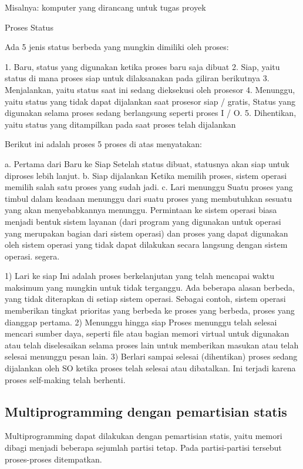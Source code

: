 Misalnya: komputer yang dirancang untuk tugas proyek

Proses Status

Ada 5 jenis status berbeda yang mungkin dimiliki oleh proses:

1. Baru, status yang digunakan ketika proses baru saja dibuat
2. Siap, yaitu status di mana proses siap untuk dilaksanakan pada giliran berikutnya
3. Menjalankan, yaitu status saat ini sedang dieksekusi oleh prosesor
4. Menunggu, yaitu status yang tidak dapat dijalankan saat prosesor siap / gratis, Status yang digunakan selama proses sedang berlangsung seperti proses I / O.
5. Dihentikan, yaitu status yang ditampilkan pada saat proses telah dijalankan

Berikut ini adalah proses 5 proses di atas menyatakan:

	a. Pertama dari Baru ke Siap
		Setelah status dibuat, statusnya akan siap untuk diproses lebih lanjut.
	b. Siap dijalankan
		Ketika memilih proses, sistem operasi memilih salah satu proses yang sudah jadi.
	c. Lari menunggu
		Suatu proses yang timbul dalam keadaan menunggu dari suatu proses yang membutuhkan sesuatu yang akan menyebabkannya menunggu. Permintaan ke sistem operasi biasa menjadi bentuk sistem layanan (dari program yang digunakan untuk operasi yang merupakan bagian dari sistem operasi) dan proses yang dapat digunakan oleh sistem operasi yang tidak dapat dilakukan secara langsung dengan sistem operasi. segera.

1) Lari ke siap
	Ini adalah proses berkelanjutan yang telah mencapai waktu maksimum yang mungkin untuk tidak terganggu. Ada beberapa alasan berbeda, yang tidak diterapkan di setiap sistem operasi. Sebagai contoh, sistem operasi memberikan tingkat prioritas yang berbeda ke proses yang berbeda, proses yang dianggap pertama.
2) Menunggu hingga siap
	Proses menunggu telah selesai mencari sumber daya, seperti file atau bagian memori virtual untuk digunakan atau telah diselesaikan selama proses lain untuk memberikan masukan atau telah selesai menunggu pesan lain.
3) Berlari sampai selesai (dihentikan)
	proses sedang dijalankan oleh SO ketika proses telah selesai atau dibatalkan. Ini terjadi karena proses self-making telah berhenti.


\subsection {Multiprogramming dengan pemartisian statis}
Multiprogramming dapat dilakukan dengan pemartisian statis, yaitu memori dibagi menjadi beberapa sejumlah partisi tetap. Pada partisi-partisi tersebut proses-proses ditempatkan.

